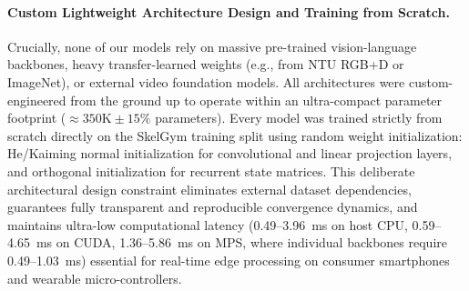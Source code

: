 \documentclass[preprint,12pt]{elsarticle}
\begin{document}
\paragraph{Custom Lightweight Architecture Design and Training from Scratch.} Crucially, none of our models rely on massive pre-trained vision-language backbones, heavy transfer-learned weights (e.g., from NTU RGB+D or ImageNet), or external video foundation models. All architectures were custom-engineered from the ground up to operate within an ultra-compact parameter footprint ($\approx 350\text{K} \pm 15\%$ parameters). Every model was trained strictly from scratch directly on the SkelGym training split using random weight initialization: He/Kaiming normal initialization \cite{he2015delving} for convolutional and linear projection layers, and orthogonal initialization for recurrent state matrices. This deliberate architectural design constraint eliminates external dataset dependencies, guarantees fully transparent and reproducible convergence dynamics, and maintains ultra-low computational latency (0.49--3.96~ms on host CPU, 0.59--4.65~ms on CUDA, 1.36--5.86~ms on MPS, where individual backbones require 0.49--1.03~ms) essential for real-time edge processing on consumer smartphones and wearable micro-controllers.
\end{document}

